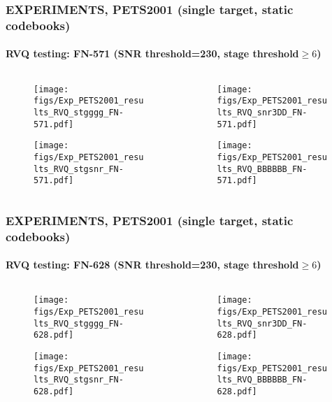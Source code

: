 \begin{frame}
\frametitle{\small EXPERIMENTS, PETS2001 (single target, static codebooks)}
\framesubtitle{RVQ testing: FN-571 (SNR threshold=230, stage threshold$\geq 6$)}
	\begin{changemargin}{-1.35in}{0in}
	\begin{columns}
		\begin{column}{1.5in}			
			\begin{figure}
				\texttt{[image: figs/Exp\_PETS2001\_results\_RVQ\_stgggg\_FN-571.pdf]}
			\end{figure}
			\begin{figure}
				\texttt{[image: figs/Exp\_PETS2001\_results\_RVQ\_stgsnr\_FN-571.pdf]}
			\end{figure}
		\end{column}
		\begin{column}{1.5in}
			\begin{figure}
				\texttt{[image: figs/Exp\_PETS2001\_results\_RVQ\_snr3DD\_FN-571.pdf]}
			\end{figure}
			\begin{figure}
				\texttt{[image: figs/Exp\_PETS2001\_results\_RVQ\_BBBBBB\_FN-571.pdf]}
			\end{figure}
		\end{column}
	\end{columns}
	\end{changemargin}
\end{frame}




\begin{frame}
\frametitle{\small EXPERIMENTS, PETS2001 (single target, static codebooks)}
\framesubtitle{RVQ testing: FN-628 (SNR threshold=230, stage threshold$\geq 6$)}
	\begin{changemargin}{-1.35in}{0in}
	\begin{columns}
		\begin{column}{1.5in}			
			\begin{figure}
				\texttt{[image: figs/Exp\_PETS2001\_results\_RVQ\_stgggg\_FN-628.pdf]}
			\end{figure}
			\begin{figure}
				\texttt{[image: figs/Exp\_PETS2001\_results\_RVQ\_stgsnr\_FN-628.pdf]}
			\end{figure}
		\end{column}
		\begin{column}{1.5in}
			\begin{figure}
				\texttt{[image: figs/Exp\_PETS2001\_results\_RVQ\_snr3DD\_FN-628.pdf]}
			\end{figure}
			\begin{figure}
				\texttt{[image: figs/Exp\_PETS2001\_results\_RVQ\_BBBBBB\_FN-628.pdf]}
			\end{figure}
		\end{column}
	\end{columns}
	\end{changemargin}
\end{frame}

